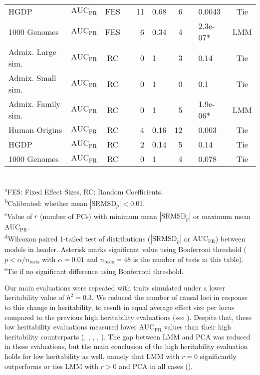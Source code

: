 \documentclass[9pt,lineno]{elife}
\newcommand{\rmsd}{\text{SRMSD}_p}
\newcommand{\auc}{\text{AUC}_\text{PR}}
\begin{document}
\begin{table}[bt]
\begin{fullwidth}
\begin{tabular}{lcc|crl|rclc}
      HGDP	&$\auc$	&FES	&	&11	&0.68	&6	&	&0.0043	&Tie \\
      1000 Genomes	&$\auc$	&FES	&	&6	&0.34	&4	&	&2.3e-07*	&LMM \\
      Admix. Large sim.	&$\auc$	&RC	&	&0	&1	&3	&	&0.14	&Tie \\
      Admix. Small sim.	&$\auc$	&RC	&	&0	&1	&0	&	&0.1	&Tie \\
      Admix. Family sim.	&$\auc$	&RC	&	&0	&1	&5	&	&1.9e-06*	&LMM \\
      Human Origins	&$\auc$	&RC	&	&4	&0.16	&12	&	&0.003	&Tie \\
      HGDP	&$\auc$	&RC	&	&2	&0.14	&5	&	&0.14	&Tie \\
      1000 Genomes	&$\auc$	&RC	&	&0	&1	&4	&	&0.078	&Tie \\
      \bottomrule
    \end{tabular}
    \\
    \textsuperscript{a}FES: Fixed Effect Sizes, RC: Random Coefficients.\\
    \textsuperscript{b}Calibrated: whether mean $|\rmsd| < 0.01$.\\
    \textsuperscript{c}Value of $r$ (number of PCs) with minimum mean $|\rmsd|$ or maximum mean $\auc$.\\
    \textsuperscript{d}Wilcoxon paired 1-tailed test of distributions ($|\rmsd|$ or $\auc$) between models in header.
    Asterisk marks significant value using Bonferroni threshold ($p < \alpha/n_\text{tests}$ with $\alpha = 0.01$ and $n_\text{tests} = 48$ is the number of tests in this table).\\
    \textsuperscript{e}Tie if no significant difference using Bonferroni threshold.
  \end{fullwidth}
\end{table}

Our main evaluations were repeated with traits simulated under a lower heritability value of $h^2 = 0.3$.
We reduced the number of causal loci in response to this change in heritability, to result in equal average effect size per locus compared to the previous high heritability evaluations (see ).
Despite that, these low heritability evaluations measured lower $\auc$ values than their high heritability counterparts (, , , , ).
The gap between LMM and PCA was reduced in these evaluations, but the main conclusion of the high heritability evaluation holds for low heritability as well, namely that LMM with $r=0$ significantly outperforms or ties LMM with $r > 0$ and PCA in all cases ().
\end{document}
